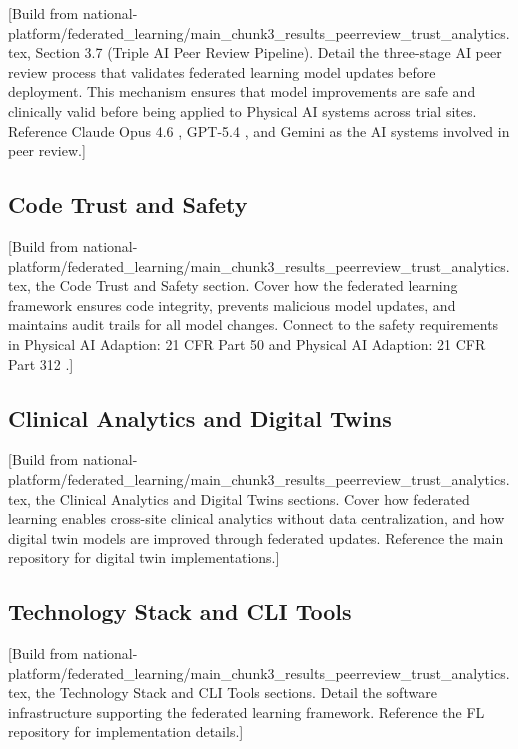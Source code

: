 [Build from national-platform/federated\_learning/main\_chunk3\_results\_peerreview\_trust\_analytics.tex,
Section 3.7 (Triple AI Peer Review Pipeline). Detail the three-stage AI
peer review process that validates federated learning model updates before
deployment. This mechanism ensures that model improvements are safe and
clinically valid before being applied to Physical AI systems across trial sites.
Reference Claude Opus 4.6 \cite{claude-opus}, GPT-5.4 \cite{gpt-5-4}, and
Gemini \cite{gemini} as the AI systems involved in peer review.]

\subsection{Code Trust and Safety}
\label{subsec:fl-trust}

[Build from national-platform/federated\_learning/main\_chunk3\_results\_peerreview\_trust\_analytics.tex,
the Code Trust and Safety section. Cover how the federated learning framework
ensures code integrity, prevents malicious model updates, and maintains
audit trails for all model changes. Connect to the safety requirements in
Physical AI Adaption: 21 CFR Part 50 \cite{cfr50-adapt} and Physical AI
Adaption: 21 CFR Part 312 \cite{cfr312-adapt}.]

\subsection{Clinical Analytics and Digital Twins}
\label{subsec:fl-analytics}

[Build from national-platform/federated\_learning/main\_chunk3\_results\_peerreview\_trust\_analytics.tex,
the Clinical Analytics and Digital Twins sections. Cover how federated
learning enables cross-site clinical analytics without data centralization,
and how digital twin models are improved through federated updates. Reference
the main repository \cite{main-repo} for digital twin implementations.]

\subsection{Technology Stack and CLI Tools}
\label{subsec:fl-tech-stack}

[Build from national-platform/federated\_learning/main\_chunk3\_results\_peerreview\_trust\_analytics.tex,
the Technology Stack and CLI Tools sections. Detail the software infrastructure
supporting the federated learning framework. Reference the FL repository
\cite{fl-repo} for implementation details.]

